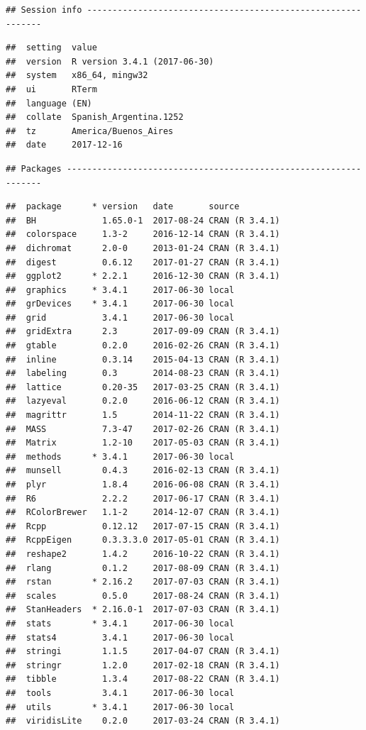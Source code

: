 \documentclass[]{article}
\begin{document}
{{{\begin{verbatim}
## Session info -------------------------------------------------------------
\end{verbatim}

\begin{verbatim}
##  setting  value                       
##  version  R version 3.4.1 (2017-06-30)
##  system   x86_64, mingw32             
##  ui       RTerm                       
##  language (EN)                        
##  collate  Spanish_Argentina.1252      
##  tz       America/Buenos_Aires        
##  date     2017-12-16
\end{verbatim}

\begin{verbatim}
## Packages -----------------------------------------------------------------
\end{verbatim}

\begin{verbatim}
##  package      * version   date       source        
##  BH             1.65.0-1  2017-08-24 CRAN (R 3.4.1)
##  colorspace     1.3-2     2016-12-14 CRAN (R 3.4.1)
##  dichromat      2.0-0     2013-01-24 CRAN (R 3.4.1)
##  digest         0.6.12    2017-01-27 CRAN (R 3.4.1)
##  ggplot2      * 2.2.1     2016-12-30 CRAN (R 3.4.1)
##  graphics     * 3.4.1     2017-06-30 local         
##  grDevices    * 3.4.1     2017-06-30 local         
##  grid           3.4.1     2017-06-30 local         
##  gridExtra      2.3       2017-09-09 CRAN (R 3.4.1)
##  gtable         0.2.0     2016-02-26 CRAN (R 3.4.1)
##  inline         0.3.14    2015-04-13 CRAN (R 3.4.1)
##  labeling       0.3       2014-08-23 CRAN (R 3.4.1)
##  lattice        0.20-35   2017-03-25 CRAN (R 3.4.1)
##  lazyeval       0.2.0     2016-06-12 CRAN (R 3.4.1)
##  magrittr       1.5       2014-11-22 CRAN (R 3.4.1)
##  MASS           7.3-47    2017-02-26 CRAN (R 3.4.1)
##  Matrix         1.2-10    2017-05-03 CRAN (R 3.4.1)
##  methods      * 3.4.1     2017-06-30 local         
##  munsell        0.4.3     2016-02-13 CRAN (R 3.4.1)
##  plyr           1.8.4     2016-06-08 CRAN (R 3.4.1)
##  R6             2.2.2     2017-06-17 CRAN (R 3.4.1)
##  RColorBrewer   1.1-2     2014-12-07 CRAN (R 3.4.1)
##  Rcpp           0.12.12   2017-07-15 CRAN (R 3.4.1)
##  RcppEigen      0.3.3.3.0 2017-05-01 CRAN (R 3.4.1)
##  reshape2       1.4.2     2016-10-22 CRAN (R 3.4.1)
##  rlang          0.1.2     2017-08-09 CRAN (R 3.4.1)
##  rstan        * 2.16.2    2017-07-03 CRAN (R 3.4.1)
##  scales         0.5.0     2017-08-24 CRAN (R 3.4.1)
##  StanHeaders  * 2.16.0-1  2017-07-03 CRAN (R 3.4.1)
##  stats        * 3.4.1     2017-06-30 local         
##  stats4         3.4.1     2017-06-30 local         
##  stringi        1.1.5     2017-04-07 CRAN (R 3.4.1)
##  stringr        1.2.0     2017-02-18 CRAN (R 3.4.1)
##  tibble         1.3.4     2017-08-22 CRAN (R 3.4.1)
##  tools          3.4.1     2017-06-30 local         
##  utils        * 3.4.1     2017-06-30 local         
##  viridisLite    0.2.0     2017-03-24 CRAN (R 3.4.1)
\end{verbatim}

}}}
\end{document}
